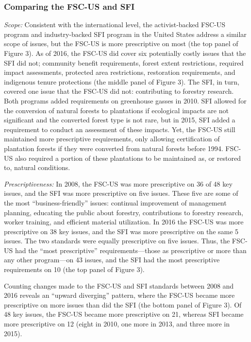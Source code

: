 \documentclass[
      12pt,
            Review ]{article}
\begin{document}
\hypertarget{comparing-the-fsc-us-and-sfi}{%
\subsubsection{Comparing the FSC-US and SFI}\label{comparing-the-fsc-us-and-sfi}}

\emph{Scope:} Consistent with the international level, the activist-backed FSC-US program and industry-backed SFI program in the United States address a similar scope of issues, but the FSC-US is more prescriptive on most (the top panel of Figure 3). As of 2016, the FSC-US did cover six potentially costly issues that the SFI did not; community benefit requirements, forest extent restrictions, required impact assessments, protected area restrictions, restoration requirements, and indigenous tenure protections (the middle panel of Figure 3). The SFI, in turn, covered one issue that the FSC-US did not: contributing to forestry research. Both programs added requirements on greenhouse gasses in 2010. SFI allowed for the conversion of natural forests to plantations if ecological impacts are not significant and the converted forest type is not rare, but in 2015, SFI added a requirement to conduct an assessment of these impacts. Yet, the FSC-US still maintained more prescriptive requirements, only allowing certification of plantation forests if they were converted from natural forests before 1994. FSC-US also required a portion of these plantations to be maintained as, or restored to, natural conditions.

\emph{Prescriptiveness:} In 2008, the FSC-US was more prescriptive on 36 of 48 key issues, and the SFI was more prescriptive on five issues. These five are some of the most ``business-friendly'' issues: continual improvement of management planning, educating the public about forestry, contributions to forestry research, worker training, and efficient material utilization. In 2016 the FSC-US was more prescriptive on 38 key issues, and the SFI was more prescriptive on the same 5 issues. The two standards were equally prescriptive on five issues. Thus, the FSC-US had the ``most prescriptive'' requirements---those as prescriptive or more than any other program---on 43 issues, and the SFI had the most prescriptive requirements on 10 (the top panel of Figure 3).

Counting changes made to the FSC-US and SFI standards between 2008 and 2016 reveals an ``upward diverging'' pattern, where the FSC-US became more prescriptive on more issues than did the SFI (the bottom panel of Figure 3). Of 48 key issues, the FSC-US became more prescriptive on 21, whereas SFI became more prescriptive on 12 (eight in 2010, one more in 2013, and three more in 2015).
\end{document}
